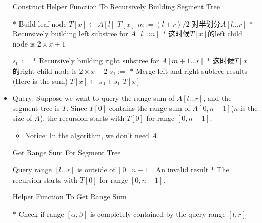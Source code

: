\begin{itemize}
\begin{algorithm}[H]
\caption{Construct Helper Function To Recursively Building Segment Tree}
\begin{algorithmic}[1]
\State $\ast$ Build leaf node
\State $T[x]\gets A[l]$
\State \Return $T[x]$
\EndIf
\State $m:=(l+r)/2$ \Comment 对半划分$ A[l\ldots r]$
\State $\ast$ Recursively building left substree for $A[l\ldots m]$
\State $\ast$ 这时候$T[x]$的left child node is $2\times x+1$
\end{algorithmic}
\end{algorithm}
\begin{algorithm}[H]
\begin{algorithmic}[1]
\State $s_0:=$
\State $\ast$ Recursively building right substree for $A[m+1\ldots r]$
\State $\ast$ 这时候$T[x]$的right child node is $2\times x+2$
\State $s_1:=$
\State $\ast$ Merge left and right subtree results (Here is the sum)
\State $T[x]\gets s_0+s_1$
\State \Return $T[x]$
\EndProcedure
\end{algorithmic}
\end{algorithm}
\item Query: Suppose we want to query the range sum of $A[l\ldots r]$, and the segment tree is $T$.  Since $T[0]$ contains the range sum of $A[0,n-1]$($n$ is the size of $A$), the recursion starts with $T[0]$ for range $[0,n-1]$.
\begin{itemize}
\item Notice: In the algorithm, we don't need $A$.
\end{itemize}
\begin{algorithm}[H]
\caption{Get Range Sum For Segment Tree}
\begin{algorithmic}[1]
 \Comment Query range $ [l\ldots r] $ is outside of $[0\ldots n-1]$
\State \Return An invalid result
\EndIf
\State $\ast$ The recursion starts with $T[0]$ for range $[0,n-1]$.
\State \Return {}
\EndProcedure
\end{algorithmic}
\end{algorithm}
\begin{algorithm}[H]
\caption{Helper Function To Get Range Sum}
\begin{algorithmic}[1]
\State $\ast$ Check if range $ [\alpha,\beta] $ is completely contained by the query range $ [l,r] $

\end{algorithmic}
\end{algorithm}
\end{itemize}
